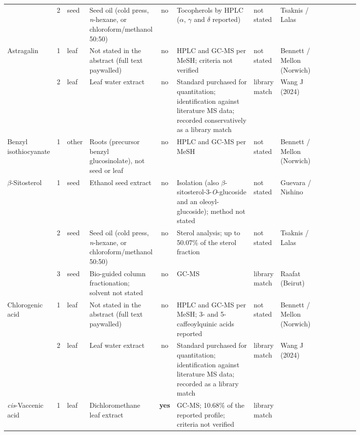 \begin{landscape}
\begin{longtable}{@{}L{0.11\linewidth} r l L{0.18\linewidth} c L{0.23\linewidth}
    L{0.075\linewidth} L{0.11\linewidth} L{0.13\linewidth}@{}}
   & 2 & seed & Seed oil (cold press, \textit{n}-hexane, or chloroform/methanol 50:50) & no
    & Tocopherols by HPLC ($\alpha$, $\gamma$ and $\delta$ reported) & not stated
    & Tsaknis / Lalas &  \\
  \addlinespace
  Astragalin & 1 & leaf & Not stated in the abstract (full text paywalled) & no
    & HPLC and GC-MS per MeSH; criteria not verified & not stated & Bennett / Mellon (Norwich)
    &  \\
   & 2 & leaf & Leaf water extract & no & Standard purchased for quantitation; identification
      against literature MS data; recorded conservatively as a library match & library match
    & Wang J (2024) &  \\
  \addlinespace
  Benzyl isothiocyanate & 1 & other & Roots (precursor benzyl glucosinolate), not seed or leaf
    & no & HPLC and GC-MS per MeSH & not stated & Bennett / Mellon (Norwich)
    &  \\
  \addlinespace
  $\beta$-Sitosterol & 1 & seed & Ethanol seed extract & no & Isolation (also
      $\beta$-sitosterol-3-\textit{O}-glucoside and an oleoyl-glucoside); method not stated
    & not stated & Guevara / Nishino &  \\
   & 2 & seed & Seed oil (cold press, \textit{n}-hexane, or chloroform/methanol 50:50) & no
    & Sterol analysis; up to 50.07\% of the sterol fraction & not stated & Tsaknis / Lalas
    &  \\
   & 3 & seed & Bio-guided column fractionation; solvent not stated & no & GC-MS
    & library match & Raafat (Beirut) &  \\
  \addlinespace
  Chlorogenic acid & 1 & leaf & Not stated in the abstract (full text paywalled) & no
    & HPLC and GC-MS per MeSH; 3- and 5-caffeoylquinic acids reported & not stated
    & Bennett / Mellon (Norwich) &  \\
   & 2 & leaf & Leaf water extract & no & Standard purchased for quantitation; identification
      against literature MS data; recorded as a library match & library match
    & Wang J (2024) &  \\
  \addlinespace
  \textit{cis}-Vaccenic acid & 1 & leaf & Dichloromethane leaf extract & \textbf{yes}
    & GC-MS; 10.68\% of the reported profile; criteria not verified & library match

\end{longtable}
\end{landscape}
